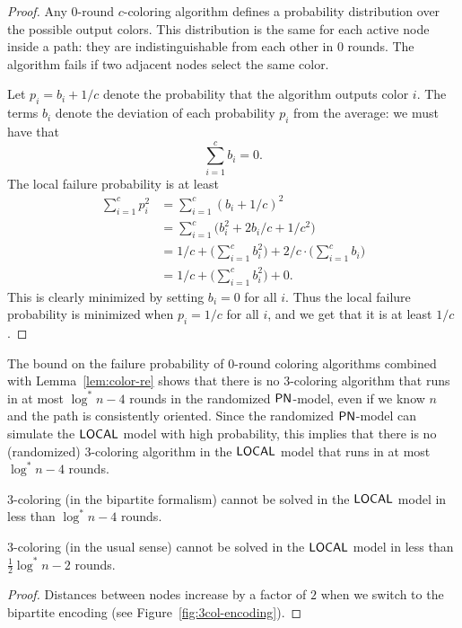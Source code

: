 \begin{proof}
	Any 0-round $c$-coloring algorithm defines a probability distribution over the possible output colors. This distribution is the same for each active node inside a path: they are indistinguishable from each other in 0 rounds. The algorithm fails if two adjacent nodes select the same color. 
	
	Let $p_i = b_i + 1/c$ denote the probability that the algorithm outputs color $i$. The terms $b_i$ denote the deviation of each probability $p_i$ from the average: we must have that
	\[
		\sum_{i=1}^c b_i = 0.
	\] 
	The local failure probability is at least
	\begin{align*}
		\sum_{i=1}^c p_i^2 &= \sum_{i=1}^c (b_i + 1/c)^2 \\
		&= \sum_{i=1}^c \bigl(b_i^2 + 2b_i/c + 1/c^2\bigr) \\
		&= 1/c + \biggl(\sum_{i=1}^c b_i^2\biggr) + 2/c \cdot \biggl(\sum_{i=1}^c b_i\biggr) \\
		&= 1/c + \biggl(\sum_{i=1}^c b_i^2\biggr) + 0.
	\end{align*}
	This is clearly minimized by setting $b_i = 0$ for all $i$. Thus the local failure probability is minimized when $p_i = 1/c$ for all $i$, and we get that it is at least $1/c$.
\end{proof}

The bound on the failure probability of 0-round coloring algorithms combined with Lemma~\ref{lem:color-re} shows that there is no 3-coloring algorithm that runs in at most $\log^* n - 4$ rounds in the randomized $\textup{\sffamily PN}$-model, even if we know $n$ and the path is consistently oriented. Since the randomized $\textup{\sffamily PN}$-model can simulate the $\textup{\sffamily LOCAL}$ model with high probability, this implies that there is no (randomized) 3-coloring algorithm in the $\textup{\sffamily LOCAL}$ model that runs in at most $\log^* n - 4$ rounds.

\begin{theorem}
	3-coloring (in the bipartite formalism) cannot be solved in the $\textup{\sffamily LOCAL}$ model in less than $\log^* n - 4$ rounds.
\end{theorem}

\begin{corollary}
	3-coloring (in the usual sense) cannot be solved in the $\textup{\sffamily LOCAL}$ model in less than $\frac{1}{2} \log^* n - 2$ rounds.
\end{corollary}
\begin{proof}
	Distances between nodes increase by a factor of $2$ when we switch to the bipartite encoding (see Figure~\ref{fig:3col-encoding}).
\end{proof}

